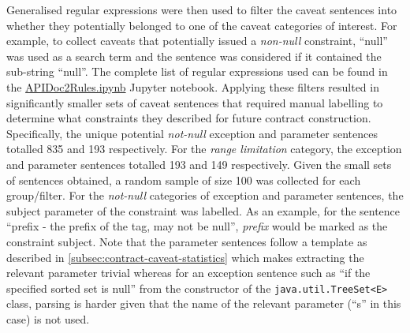 Generalised regular expressions were then used to filter the caveat sentences into whether they potentially belonged to one of the caveat categories of interest. For example, to collect caveats that potentially issued a \textit{non-null} constraint, ``null'' was used as a search term and the sentence was considered if it contained the sub-string ``null''. The complete list of regular expressions used can be found in the \url{APIDoc2Rules.ipynb} Jupyter notebook. Applying these filters resulted in significantly smaller sets of caveat sentences that required manual labelling to determine what constraints they described for future contract construction. Specifically, the unique potential \textit{not-null} exception and parameter sentences totalled 835 and 193 respectively. For the \textit{range limitation} category, the exception and parameter sentences totalled 193 and 149 respectively. Given the small sets of sentences obtained, a random sample of size 100 was collected for each group/filter. For the \textit{not-null} categories of exception and parameter sentences, the subject parameter of the constraint was labelled. As an example, for the sentence ``prefix - the prefix of the tag, may not be null'', \textit{prefix} would be marked as the constraint subject. Note that the parameter sentences follow a template as described in \ref{subsec:contract-caveat-statistics} which makes extracting the relevant parameter trivial whereas for an exception sentence such as ``if the specified sorted set is null'' from the constructor of the \lstinline{java.util.TreeSet<E>} class, parsing is harder given that the name of the relevant parameter (``s'' in this case) is not used.

